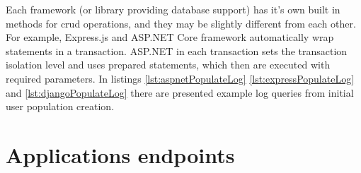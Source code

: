 Each framework (or library providing database support) has it's own built in methods for \acrshort{crud} operations, and they may be slightly different from each other. For example, Express.js and ASP.NET Core framework automatically wrap statements in a transaction. ASP.NET in each transaction sets the transaction isolation level and uses prepared statements, which then are executed with required parameters. In listings \ref{lst:aspnetPopulateLog} \ref{lst:expressPopulateLog} and \ref{lst:djangoPopulateLog} there are presented example log queries from initial user population creation.





\section{Applications endpoints}\label{sec:endpoints}

